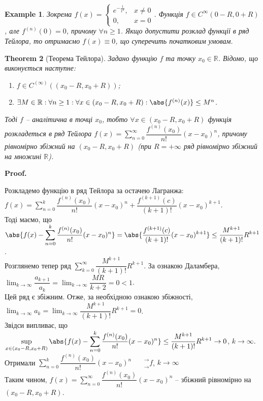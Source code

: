 \documentclass[a4paper, 10pt]{article}
\makeatletter
\def\huge{\displaystyle}
\def\qed{$\blacksquare$}
\theoremstyle{theoremdd}
\newtheorem{theorem}{Theorem}[subsection]
\theoremstyle{theoremdd}
\theoremstyle{theoremdd}
\theoremstyle{theoremdd}
\theoremstyle{theoremdd}
\newtheorem{example}[theorem]{Example}
\theoremstyle{theoremdd}
\theoremstyle{theoremdd}
\theoremstyle{theoremdd}
\theoremstyle{theoremdd}
\renewenvironment{proof}[1][Proof.\\]{\par
\pushQED{\hfill \qed}%
\normalfont \topsep6\p@\@plus6\p@\relax
\trivlist
\item\relax
{\bfseries
#1\@addpunct{.}}\hspace\labelsep\ignorespaces
}{%
\popQED\endtrivlist\@endpefalse
}
\makeatother
\begin{document}
\begin{example}
Зокрема $f(x) = \begin{cases} e^{-\frac{1}{x^2}}, & x \neq 0 \\ 0, & x = 0 \end{cases}$.  Функція $f \in C^\infty (0-R,0+R)$, але $f^{(n)}(0) = 0$, причому $\forall n \geq 1$. Якщо допустити розклад функції в ряд Тейлора, то отримаємо $f(x) \equiv 0$, що суперечить початковим умовам.
\end{example}

\begin{theorem}[Теорема Тейлора]
Задано функцію $f$ та точку $x_0 \in \mathbb{R}$. Відомо, що виконується наступне:
\begin{enumerate}[nosep,wide=0pt,label={\arabic*)}]
\item $f \in C^{(\infty)}((x_0-R,x_0+R))$;
\item $\exists M \in \mathbb{R}: \forall n \geq 1: \forall x \in (x_0-R, x_0+R): \abs{f^{(n)}(x)} \leq M^n$.
\end{enumerate}
Тоді $f$ -- аналітична в точці $x_0$, тобто $\forall x \in (x_0-R, x_0+R)$ функція розкладеться в ряд Тейлора $f(x) = \huge \sum_{n=0}^\infty \dfrac{f^{(n)}(x_0)}{n!}(x-x_0)^n$, причому рівномірно збіжний на $(x_0-R,x_0+R)$ (при $R = +\infty$ ряд рівномірно збіжний на множині $\mathbb{R}$).
\end{theorem}

\begin{proof}
Розкладемо функцію в ряд Тейлора за остачею Лагранжа:\\
$f(x) = \huge \sum_{n=0}^k \dfrac{f^{(n)}(x_0)}{n!}(x-x_0)^n + \dfrac{f^{(k+1)}(c)}{(k+1)!}(x-x_0)^{k+1}$.\\
Тоді маємо, що\\
$\huge \abs{f(x) - \sum_{n=0}^k \dfrac{f^{(n)}(x_0)}{n!}(x-x_0)^n} = \abs{\dfrac{f^{(k+1)}(c)}{(k+1)!}(x-x_0)^{k+1}} \leq \dfrac{M^{k+1}}{(k+1)!}R^{k+1}$.\\
Розглянемо тепер ряд $\huge \sum_{k=0}^\infty \dfrac{M^{k+1}}{(k+1)!} R^{k+1}$. За ознакою Даламбера, $\huge \lim_{k \to \infty} \dfrac{a_{k+1}}{a_k} = \huge \lim_{k \to \infty} \dfrac{MR}{k+2} = 0 < 1$.\\
Цей ряд є збіжним. Отже, за необхідною ознакою збіжності, $\huge \lim_{k \to \infty} a_k = \lim_{k \to \infty} \dfrac{M^{k+1}}{(k+1)!} R^{k+1} = 0$.\\
Звідси випливає, що\\
$\huge \sup_{x \in (x_0-R,x_0+R)} \abs{f(x) - \sum_{n=0}^k \dfrac{f^{(n)}(x_0)}{n!}(x-x_0)^n} \leq \dfrac{M^{k+1}}{(k+1)!}R^{k+1} \to 0$, $k \to \infty$.\\
Отримали $\huge \sum_{n=0}^k \dfrac{f^{(n)}(x_0)}{n!}(x-x_0)^n \phantom{()}^\rightarrow_\rightarrow f$, $k \to \infty$\\
Таким чином, $f(x) = \huge \sum_{n=0}^\infty \dfrac{f^{(n)}(x_0)}{n!}(x-x_0)^n$ -- збіжний рівномірно на $(x_0-R,x_0+R)$.
\end{proof}
\end{document}
